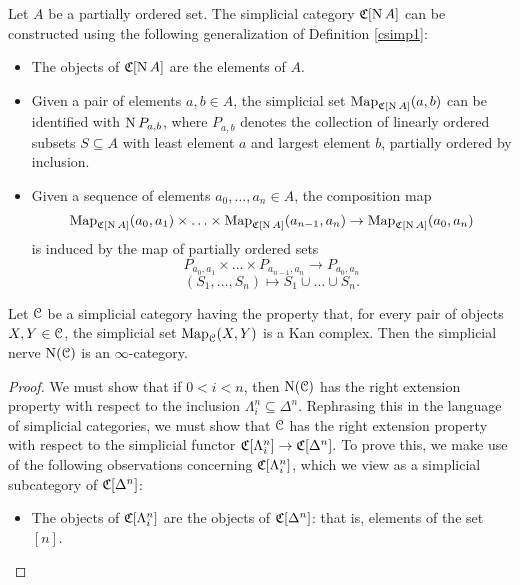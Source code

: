 \begin{1.1.5 inf-cats vs simplicial cats}
\begin{example}
Let $A$ be a partially ordered set. The simplicial category $\operatorname{\mathfrak{C}}[\operatorname{N} A]$ can be constructed using the following generalization of Definition \ref{csimp1}:
\begin{itemize}
\item The objects of $\operatorname{\mathfrak{C}}[ \operatorname{N} A]$ are the elements of $A$.
\item Given a pair of elements $a,b \in A$, the simplicial set $\operatorname{{Map}}_{ \operatorname{\mathfrak{C}}[ \operatorname{N} A]}(a,b)$ can be identified with $\operatorname{N} P_{a,b}$, where $P_{a,b}$ denotes the collection of linearly ordered subsets $S \subseteq A$ with least element $a$ and largest element $b$, partially ordered by inclusion.
\item Given a sequence of elements $a_0, \ldots, a_n \in A$, the composition map
$$ \operatorname{{Map}}_{ \operatorname{\mathfrak{C}}[ \operatorname{N} A]}(a_0, a_1) \times \ldots \times \operatorname{{Map}}_{ \operatorname{\mathfrak{C}}[ \operatorname{N} A]}( a_{n-1}, a_n) \rightarrow \operatorname{{Map}}_{ \operatorname{\mathfrak{C}}[ \operatorname{N} A]}(a_0, a_n)$$
is induced by the map of partially ordered sets
$$ P_{a_0, a_1} \times \ldots \times P_{a_{n-1}, a_n} \rightarrow P_{ a_0, a_n}$$
$$ (S_1, \ldots, S_n) \mapsto S_1 \cup \ldots \cup S_n.$$
\end{itemize}
\end{example}

\begin{proposition}\label{toothy}
Let $\operatorname{\mathcal{C}}$ be a simplicial category having the property that, for every pair of objects
$X,Y \in \operatorname{\mathcal{C}}$, the simplicial set $\operatorname{{Map}}_{\operatorname{\mathcal{C}}}(X,Y)$ is a Kan complex. Then the simplicial nerve $\operatorname{N}(\operatorname{\mathcal{C}})$ is an $\infty$-category.
\end{proposition}

\begin{proof}
We must show that if $0 < i < n$, then $\operatorname{N}(\operatorname{\mathcal{C}})$ has the right extension property with respect to the inclusion $\Lambda^n_i \subseteq \Delta^n$. Rephrasing this in the language of simplicial categories, we must show that $\operatorname{\mathcal{C}}$ has the right extension property with respect to the simplicial functor $\operatorname{\mathfrak{C}}[\Lambda^n_i] \rightarrow \operatorname{\mathfrak{C}}[\Delta^n].$
To prove this, we make use of the following observations concerning
$\operatorname{\mathfrak{C}}[\Lambda^n_i]$, which we view as a simplicial subcategory 
of $\operatorname{\mathfrak{C}}[\Delta^n]$:

\begin{itemize}
\item The objects of $\operatorname{\mathfrak{C}}[\Lambda^n_i]$ are the objects of
$\operatorname{\mathfrak{C}}[\Delta^n]$: that is, elements of the set $[n]$.


\end{itemize}
\end{proof}
\end{1.1.5 inf-cats vs simplicial cats}
